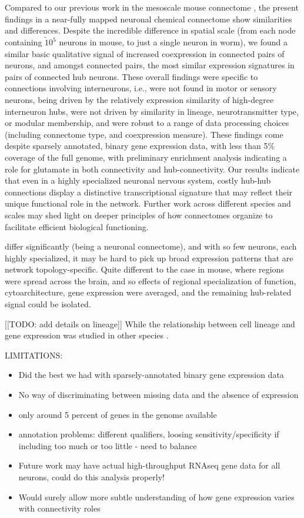 \documentclass[10pt,letterpaper]{article}
\begin{document}
Compared to our previous work in the mesoscale mouse connectome \cite{Fulcher:2016ck}, the present findings in a near-fully mapped neuronal chemical connectome show similarities and differences.
Despite the incredible difference in spatial scale (from each node containing $\tilde 10^5$ neurons in mouse, to just a single neuron in worm), we found a similar basic qualitative signal of increased coexpression in connected pairs of neurons, and amongst connected pairs, the most similar expression signatures in pairs of connected hub neurons.
These overall findings were specific to connections involving interneurons, i.e., were not found in motor or sensory neurons, being driven by the relatively expression similarity of high-degree interneuron hubs, were not driven by similarity in lineage, neurotransmitter type, or modular membership, and were robust to a range of data processing choices (including connectome type, and coexpression measure).
These findings come despite sparsely annotated, binary gene expression data, with less than 5\% coverage of the full genome, with preliminary enrichment analysis indicating a role for glutamate in both connectivity and hub-connectivity.
Our results indicate that even in a highly specialized neuronal nervous system, costly hub-hub connections display a distinctive transcriptional signature that may reflect their unique functional role in the network.
Further work across different species and scales may shed light on deeper principles of how connectomes organize to facilitate efficient biological functioning.


differ significantly (being a neuronal connectome), and with so few neurons, each highly specialized, it may be hard to pick up broad expression patterns that are network topology-specific.
Quite different to the case in mouse, where regions were spread across the brain, and so effects of regional specialization of function, cytoarchitecture, gene expression were averaged, and the remaining hub-related signal could be isolated.


[[TODO: add details on lineage]] While the relationship between cell lineage and gene expression was studied in other species \citep{Cui2007, Kluger2004}.

LIMITATIONS:
\begin{itemize}
    \item Did the best we had with sparsely-annotated binary gene expression data
    \item No way of discriminating between missing data and the absence of expression
    \item only around 5 percent of genes in the genome available
    \item annotation problems: different qualifiers, loosing sensitivity/specificity if including too much or too little - need to balance
    \item Future work may have actual high-throughput RNAseq gene data for all neurons, could do this analysis properly!
    \item Would surely allow more subtle understanding of how gene expression varies with connectivity roles
\end{itemize}
\end{document}
